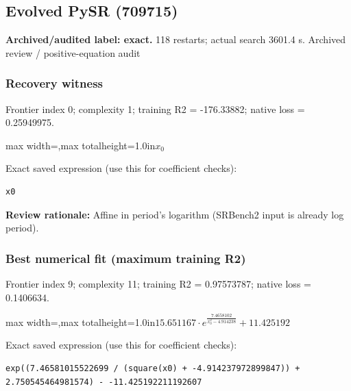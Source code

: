 \documentclass[10pt,letterpaper,landscape]{article}
\begin{document}
\begin{minipage}[t]{0.485\textwidth}
\subsection*{Evolved PySR (709715)}
\textbf{Archived/audited label: exact.} 118 restarts; actual search 3601.4 s.
{\small Archived review / positive-equation audit}
\subsubsection*{Recovery witness}
Frontier index 0; complexity 1; training R2 = -176.33882; native loss = 0.25949975.
\begin{center}\begin{adjustbox}{max width=\linewidth,max totalheight=1.0in}$\displaystyle x_{0}$\end{adjustbox}\end{center}
{\scriptsize Exact saved expression (use this for coefficient checks):}
\begin{lstlisting}
x0
\end{lstlisting}
{\small\textbf{Review rationale:} Affine in period's logarithm (SRBench2 input is already log period).}
\subsubsection*{Best numerical fit (maximum training R2)}
Frontier index 9; complexity 11; training R2 = 0.97573787; native loss = 0.1406634.
\begin{center}\begin{adjustbox}{max width=\linewidth,max totalheight=1.0in}$\displaystyle 15.651167 \cdot e^{\frac{7.4658102}{x_{0}^{2} - 4.914238}} + 11.425192$\end{adjustbox}\end{center}
{\scriptsize Exact saved expression (use this for coefficient checks):}
\begin{lstlisting}
exp((7.46581015522699 / (square(x0) + -4.914237972899847)) + 2.750545464981574) - -11.425192211192607
\end{lstlisting}
\end{minipage}
\clearpage{}\label{leavitt-10003}
\end{document}
